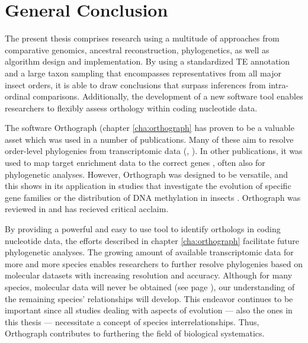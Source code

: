 \chapter{General Conclusion}
\label{conclusion}

The present thesis comprises research using a multitude of approaches
from comparative genomics, ancestral reconstruction, phylogenetics,
as well as algorithm design and implementation. By using a standardized TE
annotation and a large taxon sampling that encompasses representatives
from all major insect orders, it is able to draw conclusions that
surpass inferences from intra-ordinal comparisons.  Additionally, the
development of a new software tool enables researchers to flexibly
assess orthology within coding nucleotide data.

The software Orthograph (chapter \ref{cha:orthograph} has proven to be a
valuable asset which was used in a number of publications. Many of these
aim to resolve order-level phylogenies from transcriptomic data (\eg,
\citet{Peters2017, Bank2017, Kutty2018, Simon2018, Gillung2018,
Johnson2018}). In other publications, it was used to map target
enrichment data to the correct genes \citep{Mayer2016, Shin2018,
Sann2018}, often also for phylogenetic analyses. However, Orthograph was
designed to be versatile, and this shows in its application in studies
that investigate the evolution of specific gene families
\citep{Pauli2016, Dowling2017} or the distribution of DNA methylation in
insects \citep{Provataris2018}.  Orthograph was reviewed in
\citet{Nichio2017} and has recieved critical acclaim.

By providing a powerful and easy to use tool to identify orthologs in
coding nucleotide data, the efforts described in chapter
\ref{cha:orthograph} facilitate future phylogenetic analyses. The
growing amount of available transcriptomic data for more and more
species enables researchers to further resolve phylogenies based on
molecular datasets with increasing resolution and accuracy. Although for
many species, molecular data will never be obtained (see page
\pageref{mass-extinction}), our understanding of the remaining species'
relationships will develop. This endeavor continues to be important
since all studies dealing with aspects of evolution --- also the ones in
this thesis --- necessitate a concept of species interrelationships.
Thus, Orthograph contributes to furthering the field of biological
systematics. 

